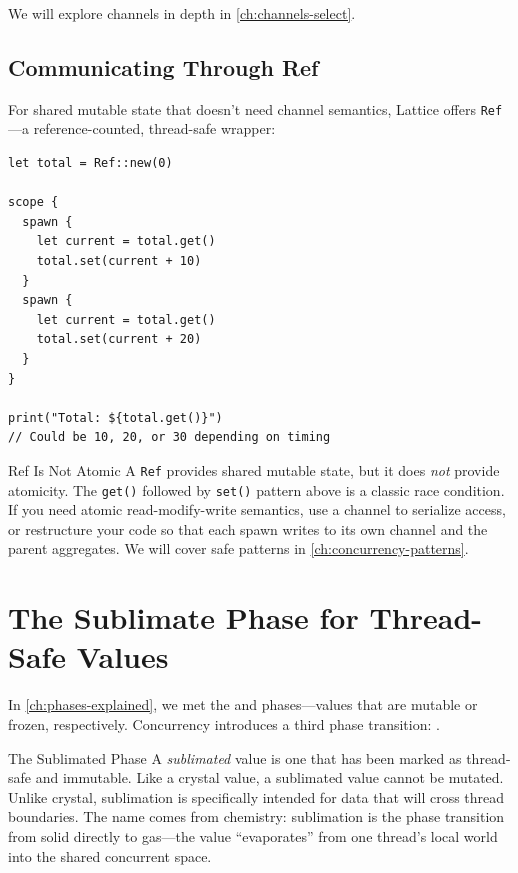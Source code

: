 We will explore channels in depth in \cref{ch:channels-select}.

\subsection{Communicating Through Ref}


For shared mutable state that doesn't need channel semantics, Lattice offers \lstinline|Ref|---a reference-counted, thread-safe wrapper:

\begin{lstlisting}[language=Lattice, caption={Using Ref for shared state}]
let total = Ref::new(0)

scope {
  spawn {
    let current = total.get()
    total.set(current + 10)
  }
  spawn {
    let current = total.get()
    total.set(current + 20)
  }
}

print("Total: ${total.get()}")
// Could be 10, 20, or 30 depending on timing
\end{lstlisting}

\begin{warnbox}{Ref Is Not Atomic}
A \lstinline|Ref| provides shared mutable state, but it does \emph{not} provide atomicity.
The \lstinline|get()| followed by \lstinline|set()| pattern above is a classic race condition.
If you need atomic read-modify-write semantics, use a channel to serialize access, or restructure your code so that each spawn writes to its own channel and the parent aggregates.
We will cover safe patterns in \cref{ch:concurrency-patterns}.
\end{warnbox}

\section{The Sublimate Phase for Thread-Safe Values}\label{sec:sublimate-phase}


In \cref{ch:phases-explained}, we met the  and  phases---values that are mutable or frozen, respectively.
Concurrency introduces a third phase transition: .

\begin{defnbox}{The Sublimated Phase}
A \emph{sublimated} value is one that has been marked as thread-safe and immutable.
Like a crystal value, a sublimated value cannot be mutated.
Unlike crystal, sublimation is specifically intended for data that will cross thread boundaries.
The name comes from chemistry: sublimation is the phase transition from solid directly to gas---the value ``evaporates'' from one thread's local world into the shared concurrent space.
\end{defnbox}

